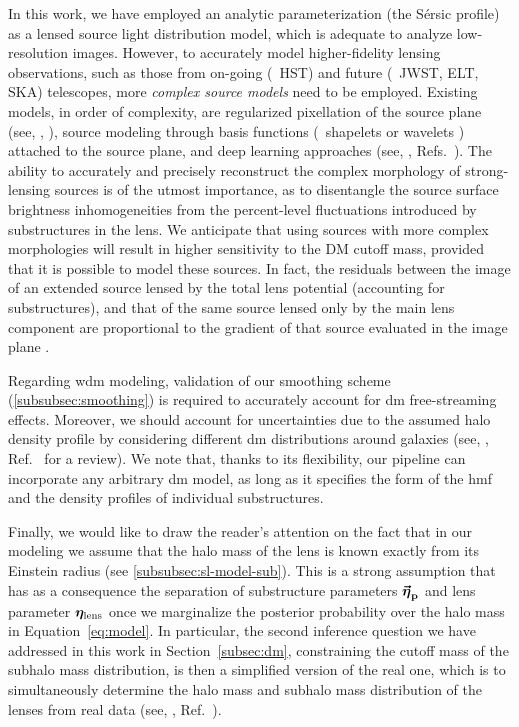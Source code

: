 In this work, we have employed an analytic parameterization (the Sérsic profile) as a lensed source light distribution model, which is adequate to analyze low-resolution images. However, to accurately model higher-fidelity lensing observations, such as those from on-going (\eg~HST) and future (\eg~JWST, ELT, SKA) telescopes, more \emph{complex source models} need to be employed. Existing models, in order of complexity, are regularized pixellation of the source plane (see, \eg, \cite{Suyu:2006fd, Karchev:2021fro, Vegetti:2008eg}), source modeling through basis functions (\eg~shapelets \cite{Birrer:2018xgm} or wavelets \cite{Galan:2020mnn}) attached to the source plane, and deep learning approaches (see, \eg, Refs.~\cite{Adam:2022esz, Morningstar:2019szx}).
The ability to accurately and precisely reconstruct the complex morphology of strong-lensing sources is of the utmost importance, as to disentangle the source surface brightness inhomogeneities from the percent-level fluctuations introduced by substructures in the lens. We anticipate that using sources with more complex morphologies will result in higher sensitivity to the DM cutoff mass, provided that it is possible to model these sources. In fact, the residuals between the image of an extended source lensed by the total lens potential (accounting for substructures), and that of the same source lensed only by the main lens component are proportional to the gradient of that source evaluated in the image plane \cite[Equation 16]{Cyr-Racine:2019aa}. 

Regarding \gls*{wdm} modeling, validation of our smoothing scheme (\autoref{subsubsec:smoothing}) is required to accurately account for \gls*{dm} free-streaming effects. Moreover, we should account for uncertainties due to the assumed halo density profile by considering different \gls*{dm} distributions around galaxies (see, \eg, Ref.~\cite{Salucci:2018aa} for a review). We note that, thanks to its flexibility, our pipeline can incorporate any arbitrary \gls*{dm} model, as long as it specifies the form of the \gls*{hmf} and the density profiles of individual substructures. 
 
Finally, we would like to draw the reader's attention on the fact that in our modeling we assume that the halo mass of the lens is known exactly from its Einstein radius (see \autoref{subsubsec:sl-model-sub}). 
This is a strong assumption that has as a consequence the separation of substructure parameters $\boldsymbol{\vec{{\bm{\eta}}}_\mathrm{p}}$ and lens parameter $\bm{\eta}_\mathrm{lens}$ once we marginalize the posterior probability over the halo mass in Equation~\eqref{eq:model}.
In particular, the second inference question we have addressed in this work in Section~\ref{subsec:dm}, constraining the cutoff mass of the subhalo mass distribution, is then a simplified version of the real one, which is to simultaneously determine the halo mass and subhalo mass distribution of the lenses from real data (see, \eg, Ref.~\cite{Birrer:2017rpp}). 


